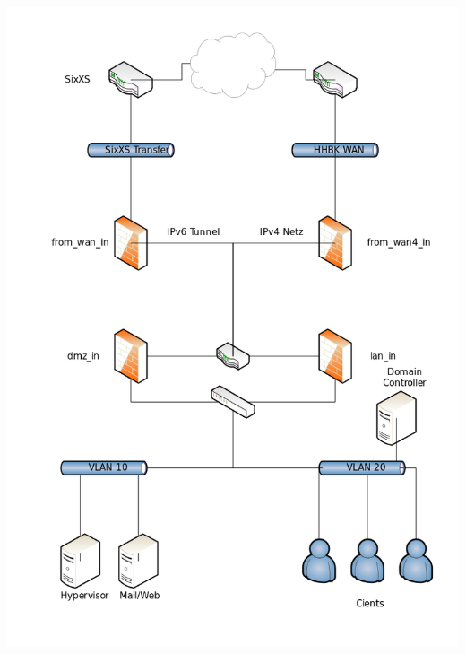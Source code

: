 \includegraphics[scale=0.5]{8gruppe_dokumentation_pictures/02_JahresProjekt_Netzwerkplan.png}
\label{realisiertes_netzwerk}

